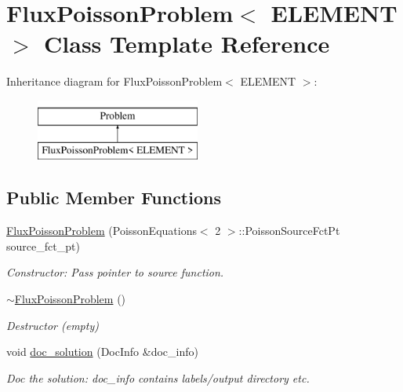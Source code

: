 \hypertarget{classFluxPoissonProblem}{}\section{Flux\+Poisson\+Problem$<$ E\+L\+E\+M\+E\+NT $>$ Class Template Reference}
\label{classFluxPoissonProblem}
Inheritance diagram for Flux\+Poisson\+Problem$<$ E\+L\+E\+M\+E\+NT $>$\+:\begin{figure}[H]
\begin{center}
\leavevmode
\includegraphics[height=2.000000cm]{classFluxPoissonProblem}
\end{center}
\end{figure}
\subsection*{Public Member Functions}
\begin{DoxyCompactItemize}
\item 
\hyperlink{classFluxPoissonProblem_a1b57e0c67634586cb69fbeeec7874e36}{Flux\+Poisson\+Problem} (Poisson\+Equations$<$ 2 $>$\+::Poisson\+Source\+Fct\+Pt source\+\_\+fct\+\_\+pt)
\begin{DoxyCompactList}\small\item\em Constructor\+: Pass pointer to source function. \end{DoxyCompactList}\item 
\hyperlink{classFluxPoissonProblem_afe4848aa1478883fa4dd59abbd7c7547}{$\sim$\+Flux\+Poisson\+Problem} ()
\begin{DoxyCompactList}\small\item\em Destructor (empty) \end{DoxyCompactList}\item 
void \hyperlink{classFluxPoissonProblem_ae410950b9dc1f2bd4991480df15a1586}{doc\+\_\+solution} (Doc\+Info \&doc\+\_\+info)
\begin{DoxyCompactList}\small\item\em Doc the solution\+: doc\+\_\+info contains labels/output directory etc. \end{DoxyCompactList}\end{DoxyCompactItemize}
